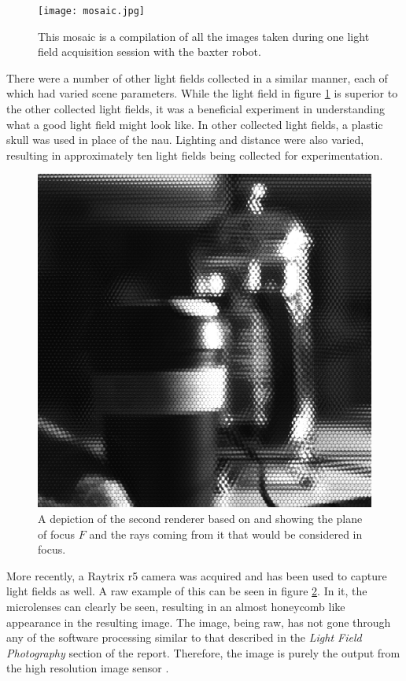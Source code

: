 \documentclass[12pt]{report}
\begin{document}
\begin{figure}[!ht]
	\centering
	\texttt{[image: mosaic.jpg]}
	\caption{This mosaic is a compilation of all the images taken during one light field acquisition session with the baxter robot.}
	\label{fig:nau_collected_images}
\end{figure}
There were a number of other light fields collected in a similar manner, each of which had varied scene parameters. While the light field in figure \ref{fig:nau_collected_images} is superior to the other collected light fields, it was a beneficial experiment in understanding what a good light field might look like. In other collected light fields, a plastic skull was used in place of the nau. Lighting and distance were also varied, resulting in approximately ten light fields being collected for experimentation. 

\begin{figure}[!ht]
	\centering
	\includegraphics[scale=0.2]{raytrix_raw.png}
	\caption{A depiction of the second renderer based on \cite{Isaksen01} and showing the plane of focus $F$ and the rays coming from it that would be considered in focus.}
	\label{fig:raytrix_raw}
\end{figure}
More recently, a Raytrix r5 camera was acquired and has been used to capture light fields as well. A raw example of this can be seen in figure \ref{fig:raytrix_raw}. In it, the microlenses can clearly be seen, resulting in an almost honeycomb like appearance in the resulting image. The image, being raw, has not gone through any of the software processing similar to that described in the \emph{Light Field Photography} section of the report. Therefore, the image is purely the output from the high resolution image sensor \cite{Perwass12}.
\end{document}
